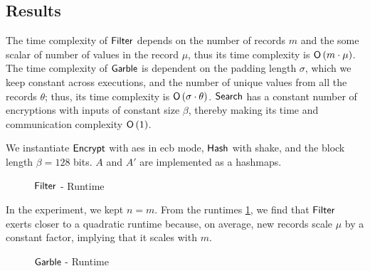 \subsection*{\thesubsection\quad Results}\label{subsec:KeywordSearchResults}


The time complexity of $ \mathsf{{Filter}} $ depends on the number of records $ m $ and the some scalar of number of values in the record $ \mu $, thus its time complexity is $ \mathsf{{O}} \left( m \cdot \mu \right) $. The time complexity of $ \mathsf{{Garble}} $ is dependent on the padding length $ \sigma $, which we keep constant across executions, and the number of unique values from all the records $ \theta $; thus, its time complexity is $ \mathsf{{O}} \left( \sigma \cdot \theta \right) $. $ \mathsf{{Search}} $ has a constant number of encryptions with inputs of constant size $ \beta $, thereby making its time and communication complexity $ \mathsf{{O}} \left( 1 \right) $.

We instantiate $ \mathsf{{Encrypt}} $ with \acrshort{aes} in \acrfull{ecb} mode, $ \mathsf{Hash} $ with \acrfull{shake}, and the block length $ \beta = 128 $ bits. $ A $ and $ A' $ are implemented as a hashmaps.

\begin{figure}[H]
    \caption{$ \mathsf{{Filter}} $ - Runtime}
    \label{fig:FilterRuntime}
    \centering
\end{figure}

In the experiment, we kept $ n = m $. From the runtimes \cref{fig:FilterRuntime}, we find that $ \mathsf{{Filter}} $ exerts closer to a quadratic runtime because, on average, new records scale $ \mu $ by a constant factor, implying that it scales with $ m $.

\begin{figure}[H]
    \caption{$ \mathsf{{Garble}} $ - Runtime}
    \label{fig:GarbleRuntime}
    \centering
\end{figure}

